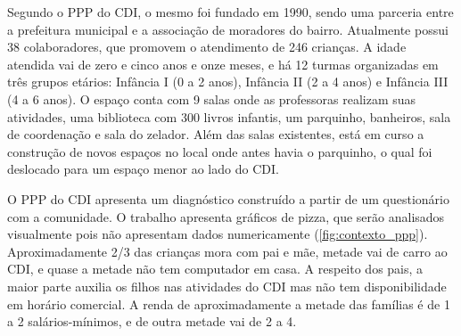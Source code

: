 Segundo o \ac{PPP} do \ac{CDI}, o mesmo foi fundado em 1990, sendo uma parceria entre a prefeitura municipal e a associação de moradores do bairro. Atualmente possui 38 colaboradores, que promovem o atendimento de 246 crianças. A idade atendida vai de zero e cinco anos e onze meses, e há 12 turmas organizadas em três grupos etários: Infância I (0 a 2 anos), Infância II (2 a 4 anos) e Infância III (4 a 6 anos). O espaço conta com 9 salas onde as professoras realizam suas atividades, uma biblioteca com 300 livros infantis, um parquinho, banheiros, sala de coordenação e sala do zelador. Além das salas existentes, está em curso a construção de novos espaços no local onde antes havia o parquinho, o qual foi deslocado para um espaço menor ao lado do CDI. 

O \ac{PPP} do \ac{CDI} apresenta um diagnóstico construído a partir de um questionário com a comunidade. O trabalho apresenta gráficos de pizza, que serão analisados visualmente pois não apresentam dados numericamente (\autoref{fig:contexto_ppp}). Aproximadamente 2/3 das crianças mora com pai e mãe, metade vai de carro ao \ac{CDI}, e quase a metade não tem computador em casa. A respeito dos pais, a maior parte auxilia os filhos nas atividades do \ac{CDI} mas não tem disponibilidade em horário comercial. A renda de aproximadamente a metade das famílias é de 1 a 2 salários-mínimos, e de outra metade vai de 2 a 4.

